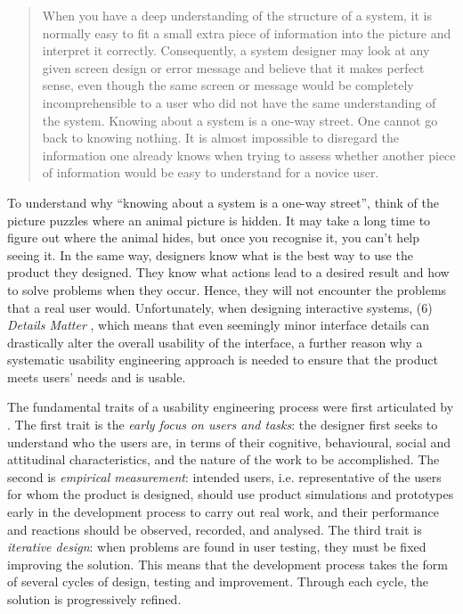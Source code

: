\begin{quote}
    When you have a deep understanding of the structure of a system, it is normally easy to fit a small extra piece of information into the picture and interpret it correctly. Consequently, a system designer may look at any given screen design or error message and believe that it makes perfect sense, even though the same screen or message would be completely incomprehensible to a user who did not have the same understanding of the system. Knowing about a system is a one-way street. One cannot go back to knowing nothing. It is almost impossible to disregard the information one already knows when trying to assess whether another piece of information would be easy to understand for a novice user. \citep[13]{nielsen1993usability}
\end{quote}
To understand why ``knowing about a system is a one-way street'', think of the picture puzzles where an animal picture is hidden. It may take a long time to figure out where the animal hides, but once you recognise it, you can’t help seeing it. In the same way, designers know what is the best way to use the product they designed. They know what actions lead to a desired result and how to solve problems when they occur. Hence, they will not encounter the problems that a real user would. Unfortunately, when designing interactive systems, (6) \textit{Details Matter} \citep[15]{nielsen1993usability}, which means that even seemingly minor interface details can drastically alter the overall usability of the interface, a further reason why a systematic usability engineering approach is needed to ensure that the product meets users’ needs and is usable.

The fundamental traits of a usability engineering process were first articulated by \citet{gould1985designing}. The first trait is the \textit{early focus on users and tasks}: the designer first seeks to understand who the users are, in terms of their cognitive, behavioural, social and attitudinal characteristics, and the nature of the work to be accomplished. The second is \textit{empirical measurement}: intended users, i.e. representative of the users for whom the product is designed, should use product simulations and prototypes early in the development process to carry out real work, and their performance and reactions should be observed, recorded, and analysed. The third trait is \textit{iterative design}: when problems are found in user testing, they must be fixed improving the solution. This means that the development process takes the form of several cycles of design, testing and improvement. Through each cycle, the solution is progressively refined.

